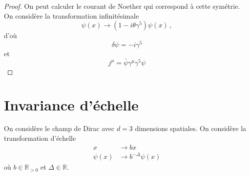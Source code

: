\documentclass{article}
\numberwithin{equation}{section}
\theoremstyle{solution}
\begin{document}
\begin{proof}
On peut calculer le courant de Noether qui correspond à cette symétrie. On considère la transformation infinitésimale
\begin{equation}
        \psi(x) \rightarrow  (1 - i \theta \gamma^{5}) \psi(x)\, ,
\end{equation} 
d'où
\begin{equation}
        \delta \psi = -i \gamma^{5}
\end{equation} 
et
\begin{equation}
        j^{\mu} = \bar{\psi} \gamma^{\mu}\gamma^{5}\psi
\end{equation} 
\end{proof} 



\section{Invariance d’échelle}
On considère le champ de Dirac avec $d=3$ dimensions spatiales. On considère la transformation d'échelle
\begin{equation}\label{eq:t_echelle}
        \begin{split}
                x &\rightarrow  b x \\
                \psi(x) &\rightarrow b^{-\Delta} \psi(x)
        \end{split}
\end{equation} 
où $b \in \mathbb{R}_{>0}$ et $\Delta \in \mathbb{R}$.
\end{document}
